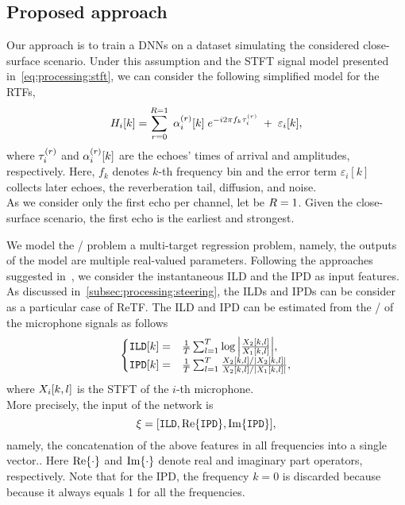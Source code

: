 \subsection{Proposed approach}\label{subsec:lantern:simple:mpl}
Our approach is to train a \acp{DNN} on a dataset simulating the considered close-surface scenario.
Under this assumption and the \acf{STFT} signal model presented in~\cref{eq:processing:stft}, we can consider the following simplified model for the \acfp{RTF},
\begin{equation}\label{eq:mirage:rir}
    H_{i}[k] = \sum_{r=0}^{R=1}  \; \alpha_{i}^{(r)}[k] \; {e}^{- {i} 2 \pi f_k \tau_{i}^{(r)}} \; + \; \varepsilon_{i}[k],
\end{equation}
where $\tau_{i}^{(r)}$ and $\alpha_{i}^{(r)}[k]$ are the echoes' times of arrival and amplitudes, respectively.
Here, $f_k$ denotes $k$-th frequency bin and the error term $\varepsilon_i[k]$ collects later echoes, the reverberation tail, diffusion, and noise.
\\As we consider only the first echo per channel, let be $R=1$.
Given the close-surface scenario, the first echo is the earliest and strongest.

\mynewline
We model the \AER/ problem a multi-target regression problem, namely, the outputs of the model are multiple real-valued parameters.
Following the approaches suggested in~, we consider the instantaneous \acf{ILD} and the \ac{IPD} as input features.
As discussed in~\cref{subsec:processing:steering}, the \acfp{ILD} and \acfp{IPD} can be consider as a particular case of \acf{ReTF}.
The \ac{ILD} and \ac{IPD} can be estimated from the \STFT/ of the microphone signals as follows
\begin{equation} \label{eq:mirage:features}
\begin{cases}
    \ild[k]  =& \tfrac{1}{T} \sum_{l=1}^T \log{\abs{\frac{\MIC_2[k,l]}{\MIC_1[k,l]}}}, \\
    \ipd[k]  =& \tfrac{1}{T} \sum_{l=1}^T \frac{\MIC_2[k,l]/ \abs{\MIC_2[k,l]}}{ \MIC_2[k,l] / \abs{\MIC_1[k,l]}},\\
\end{cases}
\end{equation}
where $X_i[k,l]$ is the \ac{STFT} of the $i$-th microphone.
\\More precisely, the input of the network is
\begin{equation*}
    \xi = \klist{ \ild, \kRe\set{\ipd}, \kIm\set{\ipd}}
    ,
\end{equation*}
namely, the concatenation of the above features in all frequencies into a single vector..
Here $\kRe\set{\cdot}$ and $\kIm\set{\cdot}$ denote real and imaginary part operators, respectively.
Note that for the \ac{IPD}, the frequency $k=0$ is discarded because because it always equals 1 for all the frequencies.

